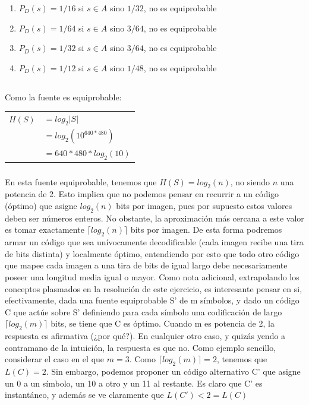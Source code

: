 \begin{enumerate}
\item $P_D(s) = 1/16$ si $s \in A$ sino $1/32$, no es equiprobable
\item $P_D(s) = 1/64$ si $s \in A$ sino $3/64$, no es equiprobable
\item $P_D(s) = 1/32$ si $s \in A$ sino $3/64$, no es equiprobable
\item $P_D(s) = 1/12$ si $s \in A$ sino $1/48$, no es equiprobable
\end{enumerate}

\subsection{}

\subsubsection{}
Como la fuente es equiprobable:

\begin{tabular}{rl}
$H(S) $ & $= log_2|S|$ \\
&$= log_2(10^{640*480})$ \\
&$= 640 * 480 * log_2(10)$ \\
\end{tabular}

\subsubsection{}
En esta fuente equiprobable, tenemos que $H(S) = log_2(n)$, no siendo $n$ una potencia de 2. Esto implica que no podemos pensar en recurrir a un código (óptimo) que asigne $log_2(n)$ bits por imagen, pues por supuesto estos valores deben ser números enteros. No obstante, la aproximación más cercana a este valor es tomar exactamente $\lceil log_2(n) \rceil$ bits por imagen. De esta forma podremos armar un código que sea unívocamente decodificable (cada imagen recibe una tira de bits distinta) y localmente óptimo, entendiendo por esto que todo otro código que mapee cada imagen a una tira de bits de igual largo debe necesariamente poseer una longitud media igual o mayor.
Como nota adicional, extrapolando los conceptos plasmados en la resolución de este ejercicio, es interesante pensar en si, efectivamente, dada una fuente equiprobable S' de m símbolos, y dado un código C que actúe sobre S' definiendo para cada símbolo una codificación de largo $\lceil log_2(m) \rceil$ bits, se tiene que C es óptimo. Cuando m es potencia de 2, la respuesta es afirmativa (¿por qué?). En cualquier otro caso, y quizás yendo a contramano de la intuición, la respuesta es que no. Como ejemplo sencillo, considerar el caso en el que $m = 3$. Como $\lceil log_2(m) \rceil = 2$, tenemos que $L(C) = 2$. Sin embargo, podemos proponer un código alternativo C' que asigne un 0 a un símbolo, un 10 a otro y un 11 al restante. Es claro que C' es instantáneo, y además se ve claramente que $L(C') < 2 = L(C)$

